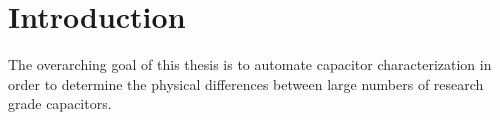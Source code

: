 \section{Introduction}
\label{sec:intro}

The overarching goal of this thesis is to automate capacitor characterization in order to determine the physical differences between large numbers of research grade capacitors. 


